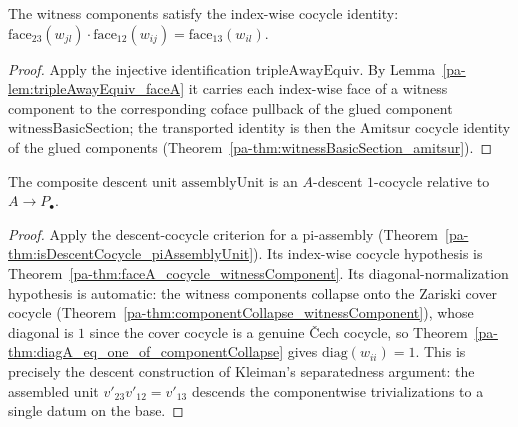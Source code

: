 \begin{theorem}
  \label{pa-thm:faceA_cocycle_witnessComponent}
  \leanok

  The witness components satisfy the index-wise cocycle identity:
  \(\mathrm{face}_{23}(w_{jl}) \cdot \mathrm{face}_{12}(w_{ij}) = \mathrm{face}_{13}(w_{il})\).
\end{theorem}
\begin{proof}
  \leanok
  Apply the injective identification \(\mathrm{tripleAwayEquiv}\). By
  Lemma~\ref{pa-lem:tripleAwayEquiv_faceA} it carries each index-wise face of a witness component
  to the corresponding coface pullback of the glued component
  \(\mathrm{witnessBasicSection}\); the transported identity is then the Amitsur cocycle
  identity of the glued components (Theorem~\ref{pa-thm:witnessBasicSection_amitsur}).
\end{proof}

\begin{theorem}
  \label{pa-thm:isDescentCocycle_assemblyUnit}
  \leanok

  The composite descent unit \(\mathrm{assemblyUnit}\) is an \(A\)-descent \(1\)-cocycle
  relative to \(A \to P_{\!\bullet}\).
\end{theorem}
\begin{proof}
  \leanok
  Apply the descent-cocycle criterion for a pi-assembly
  (Theorem~\ref{pa-thm:isDescentCocycle_piAssemblyUnit}). Its index-wise cocycle hypothesis is
  Theorem~\ref{pa-thm:faceA_cocycle_witnessComponent}. Its diagonal-normalization hypothesis is
  automatic: the witness components collapse onto the Zariski cover cocycle
  (Theorem~\ref{pa-thm:componentCollapse_witnessComponent}), whose diagonal is \(1\) since the
  cover cocycle is a genuine \v Cech cocycle, so
  Theorem~\ref{pa-thm:diagA_eq_one_of_componentCollapse} gives \(\mathrm{diag}(w_{ii}) = 1\). This
  is precisely the descent construction of Kleiman's separatedness argument: the assembled unit
  \(v'_{23} v'_{12} = v'_{13}\) descends the componentwise trivializations to a single datum on
  the base.
\end{proof}

